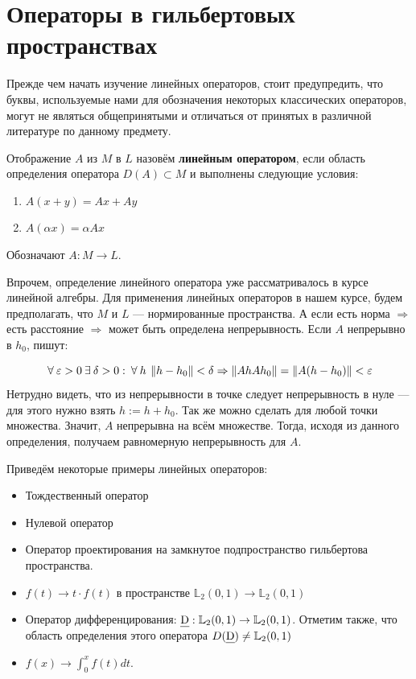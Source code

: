 \documentclass[12pt]{article}
\begin{document}
\section{Операторы в гильбертовых пространствах}

	Прежде чем начать изучение линейных операторов, стоит предупредить, что буквы, используемые нами для обозначения некоторых
	классических операторов, могут не являться общепринятыми и отличаться от принятых в различной литературе по данному предмету.
	
	\begin{defi}
		Отображение $A$ из $M$ в $L$ назовём \textbf{линейным оператором}, если область определения оператора
		$D(A) \subset M$ и выполнены следующие условия:
		\begin{enumerate}
			\item $A(x + y) = Ax + Ay$
			\item $A(\alpha x) = \alpha A x$ 
		\end{enumerate}
		Обозначают $A : M \rightarrow L$.
	\end{defi}
	
	Впрочем, определение линейного оператора уже рассматривалось в курсе линейной алгебры. Для применения линейных операторов в
	нашем курсе, будем предполагать, что $M$ и $L$ --- нормированные пространства. А если есть норма $\Rightarrow$ есть расстояние
	$\Rightarrow$ может быть определена непрерывность. Если $A$ непрерывно в $h_0$, пишут:
	
	$$ \forall \varepsilon > 0 \exists \delta > 0 : \forall h \: \norm{h - h_0} < \delta \Rightarrow \norm{Ah  Ah_0} 
	= \norm{A(h-h_0)} < \varepsilon $$
	Нетрудно видеть, что из непрерывности в точке следует непрерывность в нуле --- для этого нужно взять $h := h + h_0$. 
	Так же можно сделать для любой точки множества. Значит, $A$ непрерывна на всём множестве. Тогда, исходя из данного
	определения, получаем равномерную непрерывность для $A$.
	
	Приведём некоторые примеры линейных операторов:
	\begin{itemize}
		\item Тождественный оператор
		\item Нулевой оператор
		\item Оператор проектирования на замкнутое подпространство гильбертова пространства.
		\item $f(t) \rightarrow t \cdot f(t)$ в пространстве $\mathbb{L}_2 (0,1) \rightarrow \mathbb{L}_2 (0,1)$
		\item Оператор дифференцирования: $\text{\emph{D}}: \mathbb{L}_2 (0,1) \rightarrow \mathbb{L}_2 (0,1)$. Отметим также, что
		область определения этого оператора $D(\text{\emph{D}}) \neq \mathbb{L}_2 (0,1)$
		\item $f(x) \rightarrow \int_0^x f(t) dt$.
	\end{itemize}
	
\end{document}
